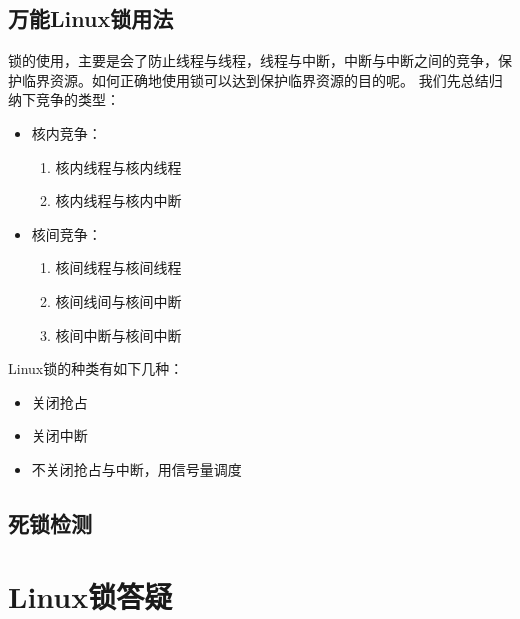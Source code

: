 \section{万能Linux锁用法}
锁的使用，主要是会了防止线程与线程，线程与中断，中断与中断之间的竞争，保护临界资源。如何正确地使用锁可以达到保护临界资源的目的呢。
我们先总结归纳下竞争的类型：
\begin{itemize}
  \item 核内竞争：\begin{enumerate}
               \item 核内线程与核内线程
               \item 核内线程与核内中断               
             \end{enumerate}
  \item 核间竞争：\begin{enumerate}
               \item 核间线程与核间线程
               \item 核间线间与核间中断
               \item 核间中断与核间中断
             \end{enumerate}
\end{itemize}
Linux锁的种类有如下几种：
\begin{itemize}
  \item 关闭抢占
  \item 关闭中断
  \item 不关闭抢占与中断，用信号量调度
\end{itemize}

\section{死锁检测}

\chapter{Linux锁答疑}
